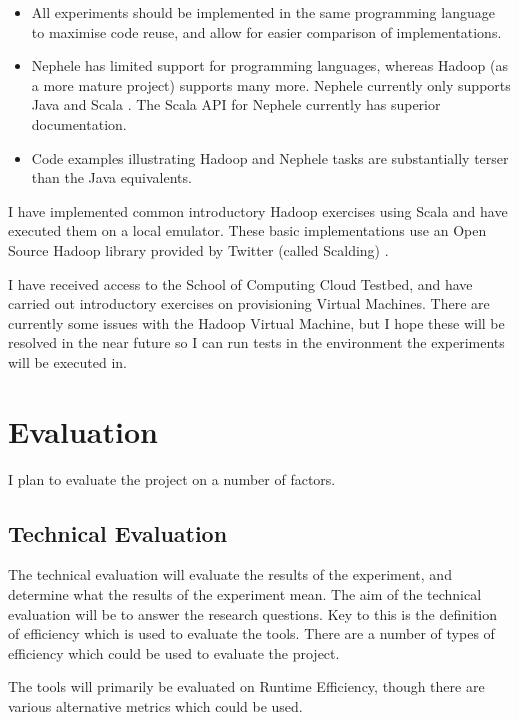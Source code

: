 \begin{itemize}
    \item All experiments should be implemented in the same programming language to maximise code reuse, and allow for easier comparison of implementations.
    \item Nephele has limited support for programming languages, whereas Hadoop (as a more mature project) supports many more. Nephele currently only supports Java and Scala \cite{stratosphereProgramming}. The Scala API for Nephele currently has superior documentation.
    \item Code examples illustrating Hadoop and Nephele tasks are substantially terser than the Java equivalents.
\end{itemize}

I have implemented common introductory Hadoop exercises using Scala and have executed them on a local emulator. These basic implementations use an Open Source Hadoop library provided by Twitter (called Scalding) \cite{scalding}.

I have received access to the School of Computing Cloud Testbed, and have carried out introductory exercises on provisioning Virtual Machines. There are currently some issues with the Hadoop Virtual Machine, but I hope these will be resolved in the near future so I can run tests in the environment the experiments will be executed in.

\section{Evaluation}
I plan to evaluate the project on a number of factors.

\subsection{Technical Evaluation}
The technical evaluation will evaluate the results of the experiment, and determine what the results of the experiment mean. The aim of the technical evaluation will be to answer the research questions. Key to this is the definition of efficiency which is used to evaluate the tools. There are a number of types of efficiency which could be used to evaluate the project.

The tools will primarily be evaluated on Runtime Efficiency, though there are various alternative metrics which could be used.

